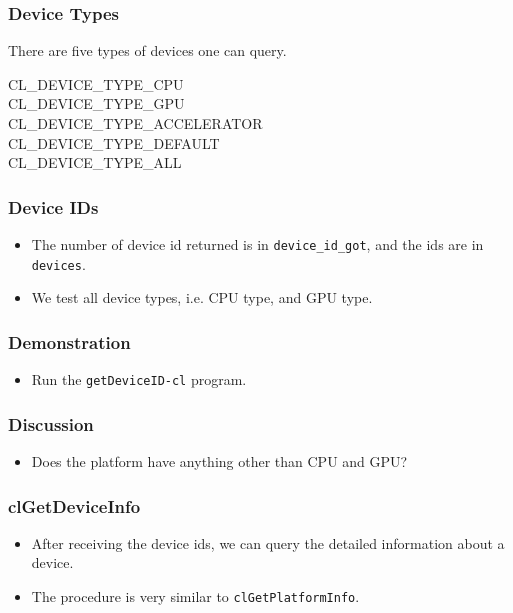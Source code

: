 \documentclass{beamer}
\begin{document}
\begin{frame}
  \frametitle{Device Types}
  There are five types of devices one can query.
  \begin{description}
  \item[CL\_DEVICE\_TYPE\_CPU]
  \item[CL\_DEVICE\_TYPE\_GPU]
  \item[CL\_DEVICE\_TYPE\_ACCELERATOR]
  \item[CL\_DEVICE\_TYPE\_DEFAULT]
  \item[CL\_DEVICE\_TYPE\_ALL]
  \end{description}
\end{frame}


\begin{frame}
  \frametitle{Device IDs}
  \begin{itemize}
  \item The number of device id returned is in {\tt device\_id\_got},
    and the ids are in {\tt devices}.
  \item We test all device types, i.e. CPU type, and GPU type.
  \end{itemize}
\end{frame}

\begin{frame}
  \frametitle{Demonstration}
  \begin{itemize}
  \item Run the {\tt getDeviceID-cl} program.
  \end{itemize}
\end{frame}

\begin{frame}
  \frametitle{Discussion}
  \begin{itemize}
  \item Does the platform have anything other than CPU and GPU?
  \end{itemize}
\end{frame}

\begin{frame}
  \frametitle{clGetDeviceInfo}
  \begin{itemize}
  \item After receiving the device ids, we can query the detailed
    information about a device.
  \item The procedure is very similar to {\tt clGetPlatformInfo}.
  \end{itemize}
\end{frame}
\end{document}
